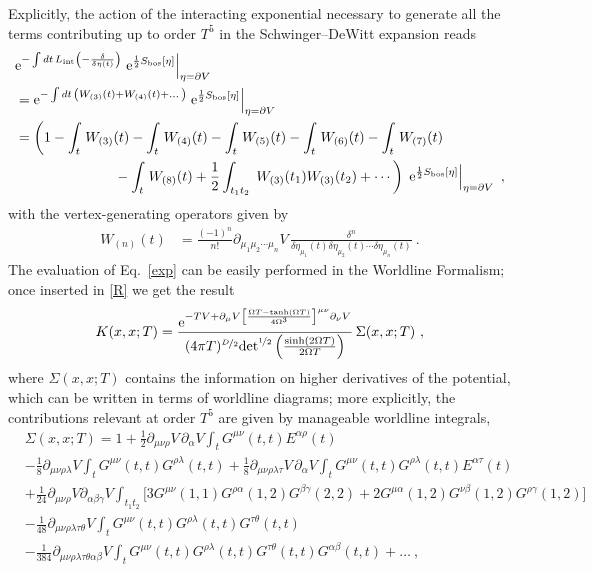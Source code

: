 \documentclass[12pt,a4paper]{article}
\numberwithin{equation}{section}
\numberwithin{equation}{section}
\begin{document}
Explicitly, the action of the interacting exponential necessary to generate all the terms contributing up to order $T^5$ in the Schwinger--DeWitt expansion reads
\begin{align} 
\label{exp}
\begin{split} 
&\mathrm{e}^{-\int dt \, L_{\mathrm{int}}\left(-\frac{\delta}{\delta \eta(t)} \right)}\left.\mathrm{e}^{\frac12 S_{\mathrm{bos}}[\eta]}\right|_{\eta=\partial V}
\\
&=\mathrm{e}^{-\int dt \, \left( W_{(3)}(t)+W_{(4)}(t)+\dots\right)} \left.\mathrm{e}^{\frac12 S_{\mathrm{bos}}[\eta]}\right|_{\eta=\partial V}
\\
&=\bigg( 1-\int_t\, W_{(3)}(t)-\int_t\, W_{(4)}(t) -\int_t\, W_{(5)}(t) -\int_t\, W_{(6)}(t) -\int_t\, W_{(7)}(t)
\\
&\hspace{2.5cm}-\int_t\, W_{(8)}(t) 
+\frac12 \int_{t_1t_2} \; W_{(3)}(t_1)W_{(3)}(t_2)+\cdots \bigg) \, \left. \mathrm{e}^{\frac12 S_{\mathrm{bos}}[\eta]}\right|_{\eta=\partial V}\ ,
\end{split}
\end{align}
with the vertex-generating operators given by
\begin{align}
W_{(n)}(t)&=\frac{(-1)^{n}}{n!} \partial_{\mu_1 \mu_2 \cdots \mu_n} V\, \frac{\delta^n}{\delta\eta_{\mu_1}(t)\delta\eta_{\mu_2}(t)\cdots\delta\eta_{\mu_n}(t)}\ . \label{V3}
\end{align}
The evaluation of Eq.~\eqref{exp} can be easily performed in the Worldline Formalism; once inserted in \eqref{R} we get the result
\begin{align}
K(x,x;T)=\frac{\mathrm{e}^{-T V+\partial_\mu V\left[\frac{\Omega T-\tanh\left( \Omega T \right)}{4 \Omega^3}\right]^{\mu\nu} \partial_\nu V}}{(4\pi T)^{\nicefrac{D}{2}} \mathrm{det}^{\nicefrac{1}{2}}\left(\frac{\sinh\left( 2\Omega T\right)}{2\Omega T}\right)} \, \Sigma(x,x;T)\ ,
\end{align}
where $\Sigma(x,x;T)$ contains the information on higher derivatives of the potential, which can be written in terms of worldline diagrams; more explicitly, the contributions relevant at order $T^5$ are given by manageable worldline integrals,
\begin{align} \label{upsilon}
&\Sigma(x,x;T)=1+\frac12 \partial_{\mu\nu\rho} V \, \partial_\alpha V \int_t G^{\mu\nu}(t,t) E^{\alpha\rho}(t)\nonumber \\
&-\frac{1}{8}\partial_{\mu\nu\rho\lambda} V \int_t G^{\mu\nu}(t,t) G^{\rho\lambda}(t,t)
+\frac{1}{8}\partial_{\mu\nu\rho\lambda\tau} V \, \partial_\alpha V\int_t G^{\mu\nu}(t,t)G^{\rho\lambda}(t,t) E^{\alpha\tau}(t) \nonumber \\
&+\frac{1}{24} \partial_{\mu\nu\rho} V \partial_{\alpha\beta\gamma} V \int_{t_1 t_2}\bigg[ 3 G^{\mu\nu}(1,1) G^{\rho\alpha}(1,2)G^{\beta\gamma}(2,2) +2G^{\mu\alpha}(1,2)G^{\nu\beta}(1,2)G^{\rho\gamma}(1,2)\bigg] \nonumber \\
&-\frac{1}{48}\partial_{\mu\nu\rho\lambda\tau\theta} V \int_t G^{\mu\nu}(t,t) G^{\rho\lambda}(t,t)G^{\tau\theta}(t,t) \nonumber \\
&-\frac{1}{384}\partial_{\mu\nu\rho\lambda\tau\theta\alpha\beta} V \int_t G^{\mu\nu}(t,t) G^{\rho\lambda}(t,t)G^{\tau\theta}(t,t)G^{\alpha\beta}(t,t)+\dots\ ,
\end{align}
\end{document}
